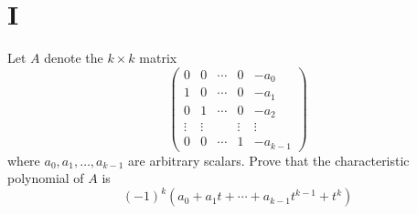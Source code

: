 \documentclass[11pt]{scrartcl}
\begin{document}
\section{I}
Let $A$ denote the $k \times k$ matrix
$$
	\left(\begin{array}{ccccc}
			0      & 0      & \cdots & 0      & -a_{0}   \\
			1      & 0      & \cdots & 0      & -a_{1}   \\
			0      & 1      & \cdots & 0      & -a_{2}   \\
			\vdots & \vdots &        & \vdots & \vdots   \\
			0      & 0      & \cdots & 1      & -a_{k-1}
		\end{array}\right)
$$
where $a_{0}, a_{1}, \ldots, a_{k-1}$ are arbitrary scalars. Prove that the characteristic polynomial of $A$ is
$$
	(-1)^{k}\left(a_{0}+a_{1} t+\cdots+a_{k-1} t^{k-1}+t^{k}\right)
$$
\end{document}
